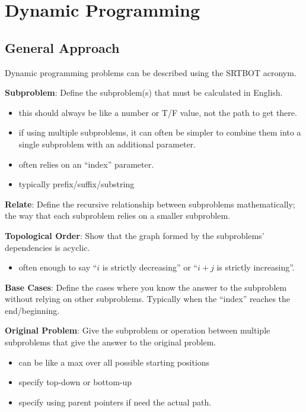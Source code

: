 \documentclass{article}
\begin{document}
\newpage
\section{Dynamic Programming}

\begin{minipage}[t]{0.49\textwidth}
    \subsection{General Approach}
    Dynamic programming problems can be described using the SRTBOT acronym.

    \vspace{3mm}
    \textbf{Subproblem}: Define the subproblem(s) that must be calculated in English. 
    \begin{itemize}[topsep=2pt, noitemsep]
        \item this should always be like a number or T/F value, not the path to get there.
        \item if using multiple subproblems, it can often be simpler to combine them into a single subproblem with an additional parameter.
        \item often relies on an ``index'' parameter.
        \item typically prefix/suffix/substring
    \end{itemize}

    \vspace{2mm}\textbf{Relate}: Define the recursive relationship between subproblems mathematically; the way that each subproblem relies on a smaller subproblem.

    \vspace{2mm}\textbf{Topological Order}: Show that the graph formed by the subproblems' dependencies is acyclic.
    \begin{itemize}[topsep=2pt, noitemsep]
        \item often enough to say ``$i$ is strictly decreasing'' or ``$i+j$ is strictly increasing''.
    \end{itemize}

    \vspace{2mm}\textbf{Base Cases}: Define the cases where you know the answer to the subproblem without relying on other subproblems. Typically when the ``index'' reaches the end/beginning.

    \vspace{2mm}\textbf{Original Problem}: Give the subproblem or operation between multiple subproblems that give the answer to the original problem.
    \begin{itemize}[topsep=2pt, noitemsep]
        \item can be like a max over all possible starting positions
        \item specify top-down or bottom-up 
        \item specify using parent pointers if need the actual path.
    \end{itemize}


\end{minipage}
\end{document}
